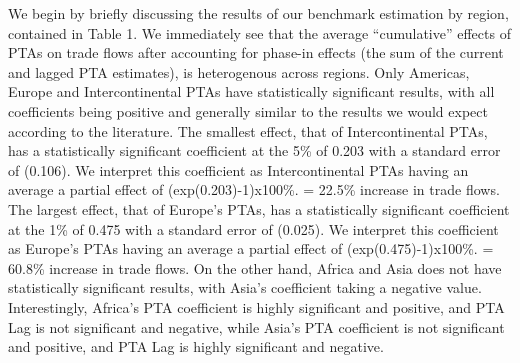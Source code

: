 We begin by briefly discussing the results of our benchmark estimation
by region, contained in Table 1. We immediately see that the average
``cumulative'' effects of PTAs on trade flows after accounting for
phase-in effects (the sum of the current and lagged PTA estimates), is
heterogenous across regions. Only Americas, Europe and Intercontinental
PTAs have statistically significant results, with all coefficients being
positive and generally similar to the results we would expect according
to the literature. The smallest effect, that of Intercontinental PTAs,
has a statistically significant coefficient at the 5\% of 0.203 with a
standard error of (0.106). We interpret this coefficient as
Intercontinental PTAs having an average a partial effect of
(exp(0.203)-1)x100\%. = 22.5\% increase in trade flows. The largest
effect, that of Europe's PTAs, has a statistically significant
coefficient at the 1\% of 0.475 with a standard error of (0.025). We
interpret this coefficient as Europe's PTAs having an average a partial
effect of (exp(0.475)-1)x100\%. = 60.8\% increase in trade flows. On the
other hand, Africa and Asia does not have statistically significant
results, with Asia's coefficient taking a negative value. Interestingly,
Africa's PTA coefficient is highly significant and positive, and PTA Lag
is not significant and negative, while Asia's PTA coefficient is not
significant and positive, and PTA Lag is highly significant and
negative.

